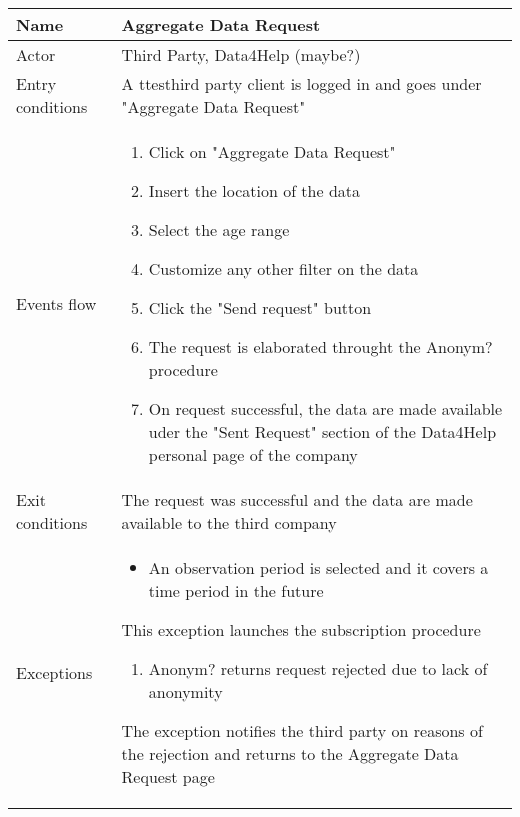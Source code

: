\begin{table}[]
\begin{tabular}{|l|l|}
\hline
Name             & Aggregate Data Request \\ \hline
Actor            & Third Party, Data4Help (maybe?) \\ \hline
Entry conditions & A ttesthird party client is logged in and goes under "Aggregate Data Request" \\ \hline
Events flow      & \begin{enumerate}
\item Click on "Aggregate Data Request"
\item Insert the location of the data
\item Select the age range
\item Customize any other filter on the data
\item Click the "Send request" button
\item The request is elaborated throught the Anonym? procedure
\item On request successful, the data are made available uder the "Sent Request" section of the Data4Help personal page of the company
\end{enumerate} \\ \hline
Exit conditions  & The request was successful and the data are made available to the third company \\ \hline
Exceptions       & \begin{itemize}
\item An observation period is selected and it covers a time period in the future
\end{itemize} This exception launches the subscription procedure
\begin{enumerate}
\item Anonym? returns request rejected due to lack of anonymity
\end{enumerate} The exception notifies the third party on reasons of the rejection and returns to the Aggregate Data Request page\\ \hline
\end{tabular}
\end{table}

